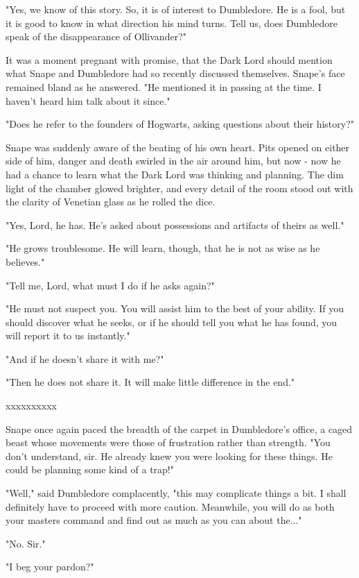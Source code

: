 \documentclass[a4paper,11pt]{article}
\begin{document}
"Yes, we know of this story. So, it is of interest to Dumbledore. He is a fool, but it is good to know in what direction his mind turns. Tell us, does Dumbledore speak of the disappearance of Ollivander?"

It was a moment pregnant with promise, that the Dark Lord should mention what Snape and Dumbledore had so recently discussed themselves. Snape's face remained bland as he answered. "He mentioned it in passing at the time. I haven't heard him talk about it since."

"Does he refer to the founders of Hogwarts, asking questions about their history?"

Snape was suddenly aware of the beating of his own heart. Pits opened on either side of him, danger and death swirled in the air around him, but now - now he had a chance to learn what the Dark Lord was thinking and planning. The dim light of the chamber glowed brighter, and every detail of the room stood out with the clarity of Venetian glass as he rolled the dice.

"Yes, Lord, he has. He's asked about possessions and artifacts of theirs as well."

"He grows troublesome. He will learn, though, that he is not as wise as he believes."

"Tell me, Lord, what must I do if he asks again?"

"He must not suspect you. You will assist him to the best of your ability. If you should discover what he seeks, or if he should tell you what he has found, you will report it to us instantly."

"And if he doesn't share it with me?"

"Then he does not share it. It will make little difference in the end."

xxxxxxxxxx

Snape once again paced the breadth of the carpet in Dumbledore's office, a caged beast whose movements were those of frustration rather than strength. "You don't understand, sir. He already knew you were looking for these things. He could be planning some kind of a trap!"

"Well," said Dumbledore complacently, "this may complicate things a bit. I shall definitely have to proceed with more caution. Meanwhile, you will do as both your masters command and find out as much as you can about the..."

"No. Sir."

"I beg your pardon?"
\end{document}
